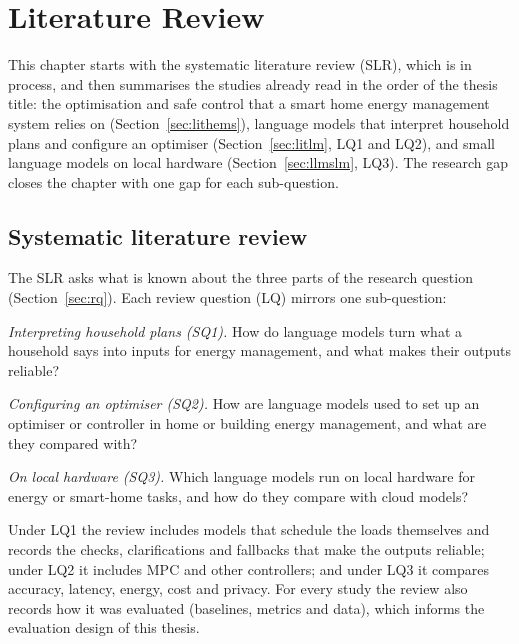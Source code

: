 \chapter{Literature Review}
\label{ch:lit}

This chapter starts with the systematic literature review (SLR), which
is in process, and then summarises the studies already read in the order
of the thesis title: the optimisation and safe control that a smart
home energy management system relies on (Section~\ref{sec:lithems}),
language models that interpret household plans and configure an
optimiser (Section~\ref{sec:litlm}, LQ1 and LQ2), and small language
models on local hardware (Section~\ref{sec:llmslm}, LQ3). The research
gap closes the chapter with one gap for each sub-question.

\section{Systematic literature review}
\label{sec:slrreview}

The SLR asks what is known about the three parts of the research
question (Section~\ref{sec:rq}). Each review question (LQ) mirrors one
sub-question:

\begin{description}[leftmargin=1.4cm, style=sameline, font=\normalfont\bfseries]
\item[LQ1] \textit{Interpreting household plans (SQ1).} How do language
models turn what a household says into inputs for energy management,
and what makes their outputs reliable?
\item[LQ2] \textit{Configuring an optimiser (SQ2).} How are language
models used to set up an optimiser or controller in home or building
energy management, and what are they compared with?
\item[LQ3] \textit{On local hardware (SQ3).} Which language models run on
local hardware for energy or smart-home tasks, and how do they compare
with cloud models?
\end{description}

Under LQ1 the review includes models that schedule the loads themselves
and records the checks, clarifications and fallbacks that make the
outputs reliable; under LQ2 it includes MPC and other controllers; and
under LQ3 it compares accuracy, latency, energy, cost and privacy. For
every study the review also records how it was evaluated (baselines,
metrics and data), which informs the evaluation design of this thesis.

